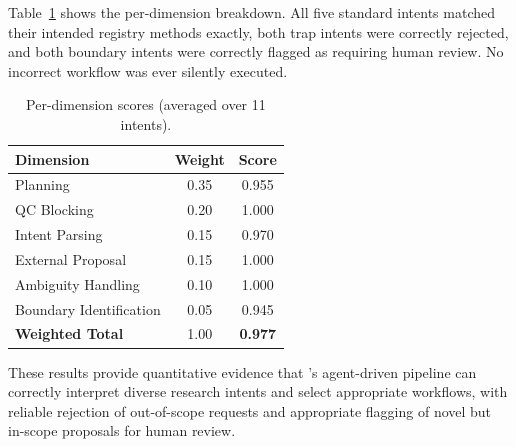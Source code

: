 Table~\ref{tab:dim_scores} shows the per-dimension breakdown. All five standard
intents matched their intended registry methods exactly, both trap intents were
correctly rejected, and both boundary intents were correctly flagged as requiring
human review. No incorrect workflow was ever silently executed.

\begin{table}[!t]
\centering
\caption{Per-dimension scores (averaged over 11 intents).}
\label{tab:dim_scores}
\footnotesize
\begin{tabular}{@{}l c c@{}}
\hline
\textbf{Dimension} & \textbf{Weight} & \textbf{Score} \\
\hline
Planning               & 0.35 & 0.955 \\
QC Blocking            & 0.20 & 1.000 \\
Intent Parsing         & 0.15 & 0.970 \\
External Proposal      & 0.15 & 1.000 \\
Ambiguity Handling     & 0.10 & 1.000 \\
Boundary Identification& 0.05 & 0.945 \\
\hline
\textbf{Weighted Total}& 1.00 & \textbf{0.977} \\
\hline
\end{tabular}
\end{table}

These results provide quantitative evidence that \dentalclaw's{} agent-driven
pipeline can correctly interpret diverse research intents and select appropriate
workflows, with reliable rejection of out-of-scope requests and appropriate
flagging of novel but in-scope proposals for human review.
